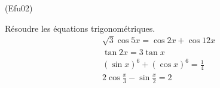 \begin{tiny}(Efu02)\end{tiny} Résoudre les équations trigonométriques.
\begin{align}
&\sqrt{3}\cos 5x =\cos 2x+\cos 12x \\
&\tan 2x = 3\tan x \\
&(\sin x)^{6}+(\cos x)^{6} = \frac{1}{4} \\
&2\cos \frac{x}{3}-\sin \frac{x}{2} = 2 
\end{align}